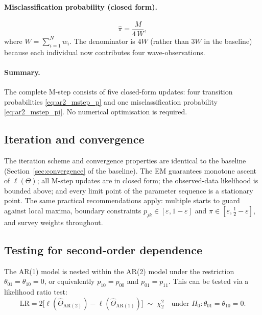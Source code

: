 \documentclass[12pt]{article}
\begin{document}
\paragraph{Misclassification probability (closed form).}
\begin{equation}
\hat{\pi} = \frac{M}{4\,W},
\label{eq:ar2_mstep_pi}
\end{equation}
where $W = \sum_{i=1}^{N} w_i$. The denominator is $4W$ (rather than
$3W$ in the baseline) because each individual now contributes four
wave-observations.

\paragraph{Summary.} The complete M-step consists of five closed-form
updates: four transition probabilities
\eqref{eq:ar2_mstep_p} and one misclassification probability
\eqref{eq:ar2_mstep_pi}. No numerical optimisation is required.

\subsection{Iteration and convergence}

The iteration scheme and convergence properties are identical to the
baseline (Section~\ref{sec:convergence} of the baseline). The EM
guarantees monotone ascent of $\ell(\Theta)$; all M-step updates are in
closed form; the observed-data likelihood is bounded above; and every
limit point of the parameter sequence is a stationary point. The same
practical recommendations apply: multiple starts to guard against local
maxima, boundary constraints
$p_{jk} \in [\varepsilon, 1 - \varepsilon]$ and
$\pi \in [\varepsilon, \tfrac{1}{2} - \varepsilon]$, and survey weights
throughout.

\subsection{Testing for second-order dependence}

The AR(1) model is nested within the AR(2) model under the restriction
$\theta_{01} = \theta_{10} = 0$, or equivalently
$p_{10} = p_{00}$ and $p_{01} = p_{11}$. This can be tested via a
likelihood ratio test:
\begin{equation}
\mathrm{LR} = 2\big[\ell(\hat\Theta_{\mathrm{AR(2)}})
  - \ell(\hat\Theta_{\mathrm{AR(1)}})\big]
\;\sim\; \chi^2_2 \quad \text{under } H_0: \theta_{01} = \theta_{10} = 0.
\label{eq:ar2_lr_test}
\end{equation}
\end{document}
